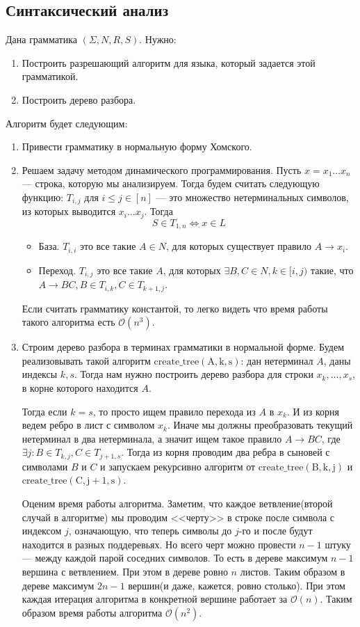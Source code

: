\subsection{Синтаксический анализ}
Дана грамматика $(\Sigma, N, R, S)$. Нужно:
\begin{enumerate}
  \item Построить разрешающий алгоритм для языка, который задается этой грамматикой.
  \item Построить дерево разбора.
\end{enumerate}
Алгоритм будет следующим:
\begin{enumerate}
  \item Привести грамматику в нормальную форму Хомского.
  \item Решаем задачу методом динамического программирования. Пусть $x = x_1\dotso x_n$ --- строка, которую мы анализируем. Тогда будем считать следующую функцию: $T_{i, j}$ для $i \leq j \in [n]$ --- это множество нетерминальных символов, из которых выводится $x_i \dotsc x_j$. Тогда 
    \begin{equation*}
      S \in T_{1, n} \iff x \in L
    \end{equation*}
  \begin{itemize}
    \item База. $T_{i, i}$ это все такие $A \in N$, для которых существует правило $A \to x_i$.
    \item Переход. $T_{i, j}$ это все такие $A$, для которых $\exists B,C \in N, k \in [i, j)$ такие, что $A \to BC, B \in T_{i, k}, C \in T_{k + 1, j}$.
  \end{itemize}
  Если считать грамматику константой, то легко видеть что время работы такого алгоритма есть $\mathcal{O}(n^3)$.
  \item Строим дерево разбора в терминах грамматики в нормальной форме. Будем реализовывать такой алгоритм $\mathrm{create\_tree(A, k, s)}$: дан нетерминал $A$, даны индексы $k, s$. Тогда нам нужно построить дерево разбора для строки $x_k, \dotsc, x_s$, в корне которого находится $A$. 

  Тогда если $k = s$, то просто ищем правило перехода из $A$ в $x_k$. И из корня ведем ребро в лист с символом $x_k$. Иначе мы должны преобразовать текущий нетерминал в два нетерминала, а значит ищем такое правило $A \to BC$, где $\exists j\colon B \in T_{k, j}, C \in T_{j + 1, s}$. Тогда из корня проводим два ребра в сыновей с символами $B$ и $C$ и запускаем рекурсивно алгоритм от $\mathrm{create\_tree(B, k, j)}$ и $\mathrm{create\_tree(C, j + 1, s)}$.

  Оценим время работы алгоритма. Заметим, что каждое ветвление(второй случай в алгоритме) мы проводим <<черту>> в строке после символа с индексом $j$, означающую, что теперь символы до $j$-го и после будут находится в разных поддеревьях. Но всего черт можно провести $n - 1$ штуку --- между каждой парой соседних символов. То есть в дереве максимум $n - 1$ вершина с ветвлением. При этом в дереве ровно $n$ листов. Таким образом в дереве максимум $2n - 1$ вершин(и даже, кажется, ровно столько). При этом каждая итерация алгоритма в конкретной вершине работает за $\mathcal{O}(n)$. Таким образом время работы алгоритма $\mathcal{O}(n^2)$.
\end{enumerate}
